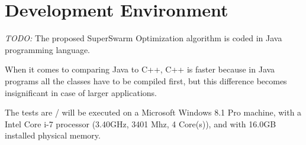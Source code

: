 \section{Development Environment}

\emph{\color{red}TODO:} 
The proposed SuperSwarm Optimization algorithm is coded in Java programming language.  

When it comes to comparing Java to C++, C++ is faster because in Java programs all the classes have to be compiled first, but this difference becomes insignificant in case of larger applications.


The tests are / will be executed on a Microsoft Windows 8.1 Pro machine, with a Intel Core i-7 processor (3.40GHz, 3401 Mhz, 4 Core(s)), and with 16.0GB installed physical memory. 

